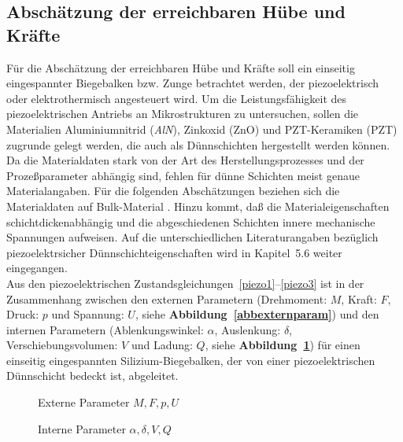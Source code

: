 
\subsection{Abschätzung der erreichbaren Hübe und Kräfte}
\label{huebeundkraefte}

Für die Abschätzung der erreichbaren Hübe und Kräfte soll ein einseitig
eingespannter Biegebalken bzw. Zunge betrachtet werden, der piezoelektrisch
oder elektrothermisch angesteuert wird.  Um die Leistungsfähigkeit des
piezoelektrischen Antriebs an Mikrostrukturen zu untersuchen, sollen die
Materialien Aluminiumnitrid ({\em AlN}), Zinkoxid (ZnO) und PZT-Keramiken
(PZT) zugrunde gelegt werden, die auch als Dünnschichten hergestellt
werden können.  Da die Materialdaten stark von der Art des
Herstellungsprozesses und der Prozeßparameter abhängig sind, fehlen für
dünne Schichten meist genaue Materialangaben.  Für die folgenden
Abschätzungen beziehen sich die Materialdaten auf Bulk-Material
\cite{Fra88, LB82, Sie81}. Hinzu kommt, daß die Materialeigenschaften
schichtdickenabhängig und die abgeschiedenen Schichten innere
mechanische Spannungen aufweisen. Auf die unterschiedlichen Literaturangaben
bezüglich piezoelektrsicher Dünnschichteigenschaften wird in Kapitel~5.6
weiter eingegangen.\\
%
Aus den piezoelektrischen Zustandsgleichungen~\ref{piezo1}--\ref{piezo3}
ist in \cite{Smi91a, Smi91b} der Zusammenhang zwischen den externen Parametern
(Drehmoment: $M$, Kraft: $F$, Druck: $p$ und Spannung: $U$, siehe
{\bf Abbildung~\ref{abbexternparam}}) und den
internen Parametern (Ablenkungswinkel: $\alpha$,
Auslenkung: $\delta$, Verschiebungsvolumen: $V$ und Ladung: $Q$, siehe
{\bf Abbildung~\ref{abbinternparam}}) für einen einseitig
eingespannten Silizium-Biegebalken, der von einer piezoelektrischen
Dünnschicht bedeckt ist, abgeleitet.
\begin{figure}[ht]
\begin{minipage}[t]{7cm}
\vspace*{4cm}
%
\caption{\label{abbexternparam}
 Externe Parameter $M, F, p, U$}
\end{minipage}
\hfill
\begin{minipage}[t]{7cm}
\vspace*{4cm}
%
\caption{\label{abbinternparam}
 Interne Parameter $\alpha, \delta, V, Q$}
\end{minipage}
\end{figure}

